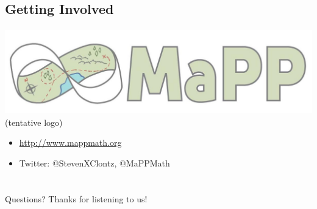 \documentclass{beamer}
\begin{document}
\subsection{Getting Involved}
\begin{frame}
  \begin{center}\tiny
    \includegraphics[height=10em]
    {mapp_logo_draft.jpg} \\
    (tentative logo)
  \end{center}
  \begin{itemize}
    \item \url{http://www.mappmath.org}
    \item Twitter: @StevenXClontz, @MaPPMath
  \end{itemize}
\end{frame}

\section*{}

\begin{frame}
Questions? Thanks for listening to us!
\end{frame}
\end{document}
